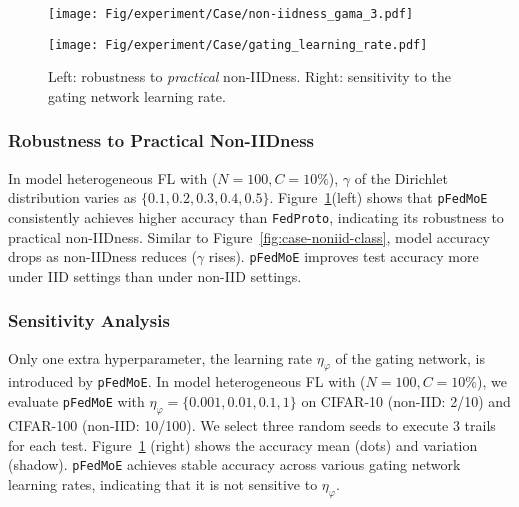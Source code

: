 \documentclass[sigconf]{acmart}
\newcommand{\hetero}{heterogeneous }
\newcommand{\methodname}{{\tt{pFedMoE}}}
\begin{document}
\begin{figure}[t]
\centering
\begin{minipage}[t]{0.5\linewidth}
\centering
\texttt{[image: Fig/experiment/Case/non-iidness\_gama\_3.pdf]}
\end{minipage}%
\begin{minipage}[t]{0.5\linewidth}
\centering
\texttt{[image: Fig/experiment/Case/gating\_learning\_rate.pdf]}
\end{minipage}%
\vspace{-1em}
\caption{Left: robustness to \textit{practical} non-IIDness. Right: sensitivity to the gating network learning rate.}
\label{fig:case-noniid-distribution-sensitivity}
\vspace{-1em}
\end{figure}


\subsubsection{Robustness to Practical Non-IIDness}
In model \hetero FL with ($N=100, C=10\%$), $\gamma$ of the Dirichlet distribution varies as $\{0.1, 0.2, 0.3, 0.4, 0.5\}$. Figure~\ref{fig:case-noniid-distribution-sensitivity}(left) shows that \methodname{} consistently achieves higher accuracy than {\tt{FedProto}}, indicating its robustness to practical non-IIDness. Similar to Figure~\ref{fig:case-noniid-class}, model accuracy drops as non-IIDness reduces ($\gamma$ rises). \methodname{} improves test accuracy more under IID settings than under non-IID settings.



\subsubsection{Sensitivity Analysis}
Only one extra hyperparameter, the learning rate $\eta_\varphi$ of the gating network, is introduced by \methodname{}. In model \hetero FL with ($N=100, C=10\%$), we evaluate \methodname{} with $\eta_\varphi=\{0.001,0.01,0.1,1\}$ on CIFAR-10 (non-IID: 2/10) and CIFAR-100 (non-IID: 10/100). We select three random seeds to execute $3$ trails for each test. Figure~\ref{fig:case-noniid-distribution-sensitivity} (right) shows the accuracy mean (dots) and variation (shadow). \methodname{} achieves stable accuracy across various gating network learning rates, indicating that it is not sensitive to $\eta_\varphi$.
\end{document}
